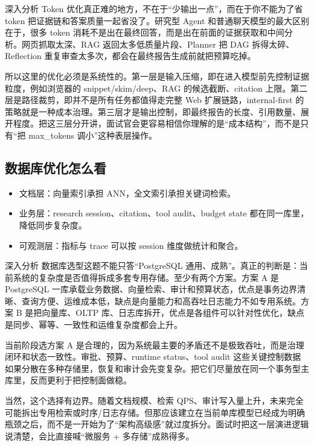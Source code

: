 \documentclass[12pt]{article}
\begin{document}
\begin{analysisBox}{深入分析}
Token 优化真正难的地方，不在于“少输出一点”，而在于你不能为了省 token 把证据链和答案质量一起省没了。研究型 Agent 和普通聊天模型的最大区别在于，很多 token 消耗不是出在最终回答，而是出在前面的证据获取和中间分析。网页抓取太深、RAG 返回太多低质量片段、Planner 把 DAG 拆得太碎、Reflection 重复审查太多次，都会在最终报告生成前就把预算吃掉。

所以这里的优化必须是系统性的。第一层是输入压缩，即在进入模型前先控制证据粒度，例如浏览器的 snippet/skim/deep、RAG 的候选截断、citation 上限。第二层是路径裁剪，即并不是所有任务都值得走完整 Web 扩展链路，internal-first 的策略就是一种成本治理。第三层才是输出控制，即最终报告的长度、引用数量、展开程度。把这三层分开讲，面试官会更容易相信你理解的是“成本结构”，而不是只有“把 max\_tokens 调小”这种表层操作。
\end{analysisBox}

\subsection{数据库优化怎么看}
\begin{itemize}[leftmargin=2em]
  \item 文档层：向量索引承担 ANN，全文索引承担关键词检索。
  \item 业务层：research session、citation、tool audit、budget state 都在同一库里，降低同步复杂度。
  \item 可观测层：指标与 trace 可以按 session 维度做统计和聚合。
\end{itemize}

\begin{analysisBox}{深入分析}
数据库选型这题不能只答“PostgreSQL 通用、成熟”。真正的判断是：当前系统的复杂度是否值得拆成多套专用存储。至少有两个方案。方案 A 是 PostgreSQL 一库承载业务数据、向量检索、审计和预算状态，优点是事务边界清晰、查询方便、运维成本低，缺点是向量能力和高吞吐日志能力不如专用系统。方案 B 是把向量库、OLTP 库、日志库拆开，优点是各组件可以针对性优化，缺点是同步、幂等、一致性和运维复杂度都会上升。

当前阶段选方案 A 是合理的，因为系统最主要的矛盾还不是极致吞吐，而是治理闭环和状态一致性。审批、预算、runtime status、tool audit 这些关键控制数据如果分散在多种存储里，恢复和审计会先变复杂。把它们尽量放在同一个事务型主库里，反而更利于把控制面做稳。

当然，这个选择有边界。随着文档规模、检索 QPS、审计写入量上升，未来完全可能拆出专用检索或时序/日志存储。但那应该建立在当前单库模型已经成为明确瓶颈之后，而不是一开始为了“架构高级感”就过度拆分。面试时把这一层演进逻辑说清楚，会比直接喊“微服务 + 多存储”成熟得多。
\end{analysisBox}
\end{document}
